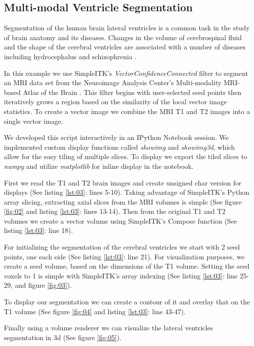 \documentclass{frontiersMED} %
\begin{document}
\subsection{Multi-modal Ventricle Segmentation}
Segmentation of the human brain lateral ventricles is a common task in the
study of brain anatomy and its diseases.  Changes in the volume of
cerebrospinal fluid and the shape of the cerebral ventricles are
associated with a number of diseases including hydrocephalus
\cite{Brandt1994} and schizophrenia \cite{Staal2000}.

In this example we use SimpleITK's \textit{VectorConfidenceConnected} filter
\cite{Ibanez2005} to segment an MRI data set from the Neuroimage Analysis
Center's Multi-modality MRI-based Atlas of the Brain \cite{Halle2013}.
This filter begins with user-selected seed points then iteratively
grows a region based on the similarity of the local vector image
statistics. To create a vector image we combine the MRI T1 and T2
images into a single vector image.

We developed this script interactively in an IPython Notebook
\cite{Perez2007} session. We implemented custom display functions
called \textit{showimg} and \textit{showimg3d}, which allow for the
easy tiling of multiple slices. To display we export the tiled slices
to \textit{numpy} and utilize \textit{matplotlib} for inline display
in the notebook.

First we read the T1 and T2 brain images and create unsigned char
version for displays (See listing \ref{lst:03}: lines 5-10).
Taking advantage of SimpleITK's Python array slicing, extracting
axial slices from the MRI volumes is simple (See figure \ref{fig:02}
and listing \ref{lst:03}: lines 13-14). Then from the original T1 and T2 volumes we
create a vector volume using SimpleITK's Compose function (See listing \ref{lst:03}: line 18).

For initializing the segmentation of the cerebral ventricles  we start with
2 seed points, one each side (See listing \ref{lst:03}: line 21).
For visualization purposes, we create
a seed volume, based on the dimensions of the T1 volume.  Setting the
seed voxels to 1 is simple with SimpleITK's array indexing (See listing
\ref{lst:03}: line 25-29, and figure \ref{fig:03}).

To display our segmentation we can create a contour of it and overlay
that on the T1 volume (See figure \ref{fig:04} and listing
\ref{lst:03}: line 43-47).

Finally using a volume renderer we can visualize the lateral ventricles
segmentation in 3d (See figure \ref{fig:05}).
\end{document}
